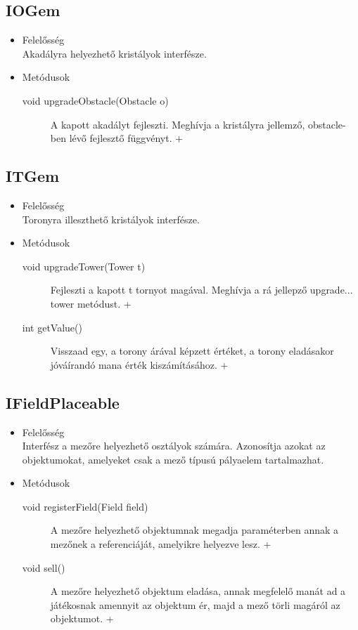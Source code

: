 \subsection{IOGem}
\begin{itemize}
\item Felelősség\\
Akadályra helyezhető kristályok interfésze.

\item Metódusok\\
	\begin{description}
		\item[void upgradeObstacle(Obstacle o)] A kapott akadályt fejleszti. Meghívja a kristályra jellemző, obstacle-ben lévő fejlesztő függvényt. +
		
	\end{description}
\end{itemize}
\subsection{ITGem}
\begin{itemize}
\item Felelősség\\
Toronyra illeszthető kristályok interfésze.

\item Metódusok\\
	\begin{description}
		\item[void upgradeTower(Tower t)] Fejleszti a kapott t tornyot magával. Meghívja a rá jellepző upgrade...  tower metódust. +
\item[int getValue()] Visszaad egy, a torony árával képzett értéket, a torony eladásakor jóváírandó mana érték kiszámításához. +

		
	\end{description}
\end{itemize}
\subsection{IFieldPlaceable}
\begin{itemize}
\item Felelősség\\
Interfész a mezőre helyezhető osztályok számára. Azonosítja azokat az objektumokat, amelyeket csak a mező típusú pályaelem tartalmazhat.

\item Metódusok\\
	\begin{description}
		\item[void registerField(Field field)] A mezőre helyezhető objektumnak megadja  paraméterben annak a mezőnek a referenciáját, amelyikre helyezve lesz. +
\item[void sell()] A mezőre helyezhető objektum eladása, annak megfelelő manát ad a játékosnak amennyit az objektum ér, majd a mező törli magáról az objektumot. +

		
	\end{description}
\end{itemize}
